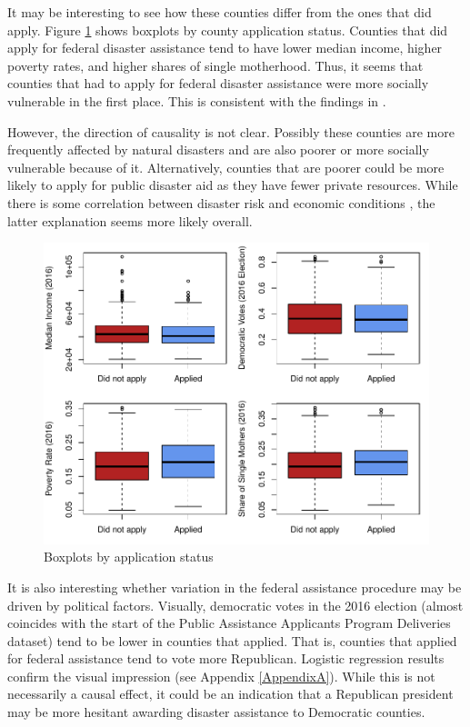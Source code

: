 

It may be interesting to see how these counties differ from the ones that did apply. Figure \ref{AssistCovBoxplot} shows boxplots by county application status. Counties that did apply for federal disaster assistance tend to have lower median income, higher poverty rates, and higher shares of single motherhood. Thus, it seems that counties that had to apply for federal disaster assistance were more socially vulnerable in the first place. This is consistent with the findings in \cite{Gao_2022}.

However, the direction of causality is not clear. Possibly these counties are more frequently affected by natural disasters and are also poorer or more socially vulnerable because of it. Alternatively, counties that are poorer could be more likely to apply for public disaster aid as they have fewer private resources. While there is some correlation between disaster risk and economic conditions \citep[for example][]{Goodman_2020}, the latter explanation seems more likely overall.

\begin{figure}[!h]
	\centering
	\includegraphics[scale=1]{"../Code & Data/AssistanceCovBoxplot.pdf"}
	\caption{Boxplots by application status}
	\label{AssistCovBoxplot}
\end{figure}

It is also interesting whether variation in the federal assistance procedure may be driven by political factors. Visually, democratic votes in the 2016 election (almost coincides with the start of the Public Assistance Applicants Program Deliveries dataset) tend to be lower in counties that applied. That is, counties that applied for federal assistance tend to vote more Republican. Logistic regression results confirm the visual impression (see Appendix \ref{AppendixA}). While this is not necessarily a causal effect, it could be an indication that a Republican president may be more hesitant awarding disaster assistance to Democratic counties.


